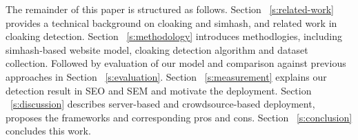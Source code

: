 The remainder of this paper is structured as follows. Section
~\autoref{s:related-work} provides a
technical background on cloaking and simhash, and related work in cloaking
detection. Section ~\autoref{s:methodology} introduces methodlogies, including simhash-based website
model, cloaking detection algorithm and dataset collection.
Followed by evaluation of our model and comparison against previous approaches
in Section ~\autoref{s:evaluation}.
Section ~\autoref{s:measurement} explains our detection result in SEO and SEM
and motivate the deployment.
Section ~\autoref{s:discussion} describes server-based and crowdsource-based
deployment, proposes the frameworks and corresponding pros and cons. Section
~\autoref{s:conclusion} concludes this work.

